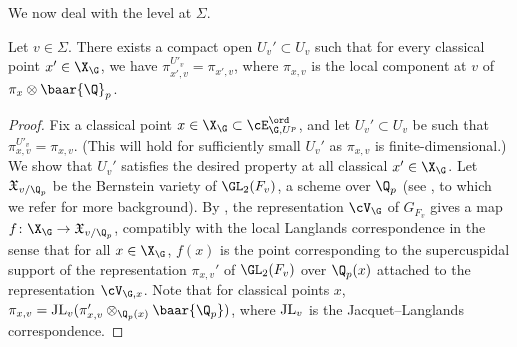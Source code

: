 We now deal with the level at $\Sigma$.
\begin{lemm}\label{levSig}
 Let $v\in \Sigma$. There exists a compact open $U_{v}'\subset U_{v}$ such that for every classical point $x'\in \X_{\G}$, we have $\pi_{x',v}^{U'_{v}}=\pi_{x',v}$,
where $\pi_{x,v}$ is the local component at $v$ of $\pi_{x}\otimes \baar{\Q}_{p}$.
\end{lemm}
\begin{proof}
Fix a classical point $x\in \X_{\G} \subset \cE^{\ord}_{\G, U^{p}}$, and let $U_{v}'\subset U_{v}$ be such that
 $\pi_{x,v}^{U'_{v}}=\pi_{x,v}$. (This will hold for sufficiently small $U_{v}'$ as $\pi_{x,v}$ is finite-dimensional.) We show that $U_{v}'$ satisfies the desired property at all classical $x'\in \X_{\G}$.
Let $\mathfrak{X}_{v/\Q_{p}}$ be the   Bernstein variety of $\GL_{2}(F_{v})$, a scheme over $\Q_{p}$  (see \cite{LLC}, to which we refer for more background).
By \cite[Theorem 3.2.1]{LLC}, the representation $\cV_{\G}$ of $G_{F_{v}}$ gives a map $f\colon \X_{\G}\to \mathfrak{X}_{v/\Q_{p}}$,
 compatibly with the local Langlands correspondence in the sense that for all $x\in  \X_{\G}$,   $f(x)$ is the point corresponding to the supercuspidal support of the representation $\pi_{x,v}'$ of $\GL_{2}(F_{v})$ over $\Q_{p}(x)$ attached to the representation $\cV_{\G, x}$. Note that for classical points $x$, $\pi_{x,v}={\rm JL}_{v}(\pi'_{x,v} \otimes_{\Q_{p}(x)}\baar{\Q_{p}})$, where  ${\rm JL}_{v}$ is the Jacquet--Langlands correspondence.


\end{proof}
